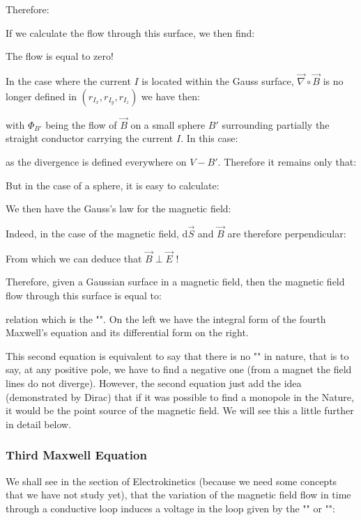 	Therefore:
	
	If we calculate the flow through this surface, we then find:
	
	The flow is equal to zero!
	
	In the case where the current $I$ is located within the Gauss surface, $\vec{\nabla}\circ\vec{B}$ is no longer defined in $(r_{I_x},r_{I_y},r_{I_z})$ we have then:
	
	with $\Phi_{B'}$ being the flow of $\vec{B}$ on a small sphere $B'$ surrounding partially the straight conductor carrying the current $I$. In this case:
	
	as the divergence is defined everywhere on $V-B'$. Therefore it remains only that:
	
	But in the case of a sphere, it is easy to calculate:
	
	We then have the Gauss's law for the magnetic field:
	
	Indeed, in the case of the magnetic field, $\mathrm{d}\vec{S}$ and $\vec{B}$ are therefore perpendicular:
	
	\begin{tcolorbox}[title=Remark,colframe=black,arc=10pt]
	From which we can deduce that $\vec{B} \perp\vec{E}$ !
	\end{tcolorbox}
	Therefore, given a Gaussian surface in a magnetic field, then the magnetic field flow through this surface is equal to:
	
	relation which is the "". On the left we have the integral form of the fourth Maxwell's equation and its differential form on the right.
	
	This second equation is equivalent to say that there is no "" in nature, that is to say, at any positive pole, we have to find a negative one (from a magnet the field lines do not diverge). However, the second equation just add the idea (demonstrated by Dirac) that if it was possible to find a monopole in the Nature, it would be the point source of the magnetic field. We will see this a little further in detail below.
	
	\subsubsection{Third Maxwell Equation}
	We shall see in the section of Electrokinetics (because we need some concepts that we have not study yet), that the variation of the magnetic field flow in time through a conductive loop induces a voltage in the loop given by the "" or "":
	
